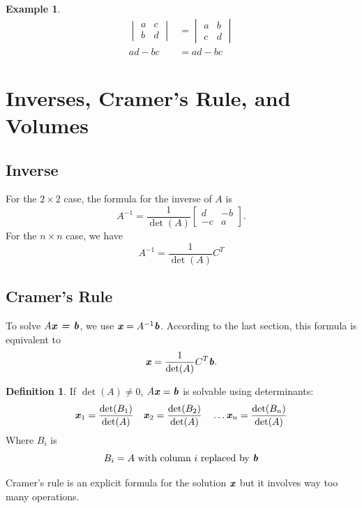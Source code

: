 \documentclass[12pt, letterpaper]{article}
\newcommand{\V}[1]{\textbf{\textit{#1}}}
\newcommand{\inverse}[1]{#1^{-1}}
\newcommand{\DefinitionSpace}{\vspace{15px}}
\theoremstyle{definition}
\newtheorem{definition}{Definition}[section]
\newtheorem{example}{Example}
\begin{document}
	\begin{example}
		\begin{align*}
			\begin{vmatrix}
			a & c \\
			b & d
			\end{vmatrix} &= \begin{vmatrix}
								a & b\\ 
								c & d
								\end{vmatrix} \\
			ad - bc &= ad - bc
		\end{align*}
	\end{example}





\section{Inverses, Cramer's Rule, and Volumes}
\subsection{Inverse}
For the $2 \times 2$ case, the formula for the inverse of $A$ is \[ A^{-1} = \frac{1}{\det(A)}\begin{bmatrix}
																						d & -b \\
																						-c & a
																						\end{bmatrix}. \]For the $n \times n$ case, we have \[ A^{-1} = \frac{1}{\det(A)} C^{T} \]
																						
\subsection{Cramer's Rule}
To solve $A\V{x = \V{b}}$, we use $\V{x} = \inverse{A} \V{b}$. According to the last section, this formula is equivalent to \[\V{x} = \frac{1}{\det(A)} C^{T} \V{b}. \] 
	\DefinitionSpace
	\begin{definition}
		If $\det(A) \ne 0$, $A\V{x} = \V{b}$ is solvable using determinants:
			\begin{equation}
				\V{x}_1 = \frac{\det(B_1)}{\det(A)} \quad \V{x}_2 = \frac{\det(B_2)}{\det(A)} \quad \ldots \V{x}_n = \frac{\det(B_n)}{\det(A)}
			\end{equation}Where $B_i$ is \begin{equation*} B_i = \text{$A$ with column $i$ replaced by $\V{b}$}\end{equation*}
	\end{definition}
	\DefinitionSpace
Cramer's rule is an explicit formula for the solution $\V{x}$ but it involves way too many operations.	
\end{document}
